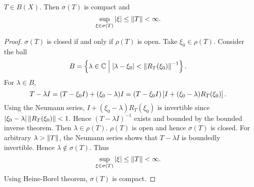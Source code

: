 \begin{theorem}
    $T\in B(X)$. Then $\sigma(T)$ is compact and 
    \begin{equation*}
        \sup_{\xi\in\sigma(T)}\left\lvert {\xi} \right\rvert \leq \left\lVert {T} \right\rVert < \infty. 
    \end{equation*}
\end{theorem}
\begin{proof}
    $\sigma(T)$ is closed if and only if $\rho(T)$ is open. 
    Take $\xi_0\in\rho(T)$. Consider the ball 
    \begin{equation*}
        B = \left\{ \lambda\in\mathbb{C} \;\middle\vert\; \left\lvert {\lambda - \xi_0} \right\rvert < \left\lVert {R_T(\xi_0)} \right\rVert^{-1} \right\}. 
    \end{equation*}
    For $\lambda\in B$, 
    \begin{equation*}
        T - \lambda I = (T - \xi_0 I) + (\xi_0 - \lambda)I 
        = (T - \xi_0 I)\left[ {I + (\xi_0 - \lambda)R_T(\xi_0)} \right].
    \end{equation*}
    Using the Neumann series, $I + (\xi_0 - \lambda)R_T(\xi_0)$ 
    is invertible since $\left\lvert {\xi_0 - \lambda} \right\rvert\left\lVert {R_T(\xi_0)} \right\rVert < 1$. 
    Hence $(T - \lambda I)^{-1}$ exists and bounded by the bounded inverse 
    theorem. Then $\lambda\in\rho(T)$. $\rho(T)$ is open and hence $\sigma(T)$ 
    is closed. For arbitrary $\lambda>\left\lVert {T} \right\rVert$, the Neumann series 
    shows that $T - \lambda I$ is boundedly invertible. Hence $\lambda\notin\sigma(T)$. 
    Thus 
    \begin{equation*}
        \sup_{\xi\in\sigma(T)}\left\lvert {\xi} \right\rvert \leq \left\lVert {T} \right\rVert < \infty.
    \end{equation*}
    Using Heine-Borel theorem, $\sigma(T)$ is compact.
\end{proof}

